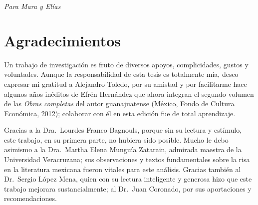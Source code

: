 \documentclass[14pt,twoside,final]{extbook} %
\begin{document}
\setcounter{page}{1}
\parindent=5mm %
\parskip=0mm %
\newpage
\pagestyle{empty}
\newpage
\pagestyle{empty}
\null\vfill
\newpage
\pagestyle{empty}
\vspace*{42pt}
\begin{flushright}
\textit{Para Mara y Elías}
\end{flushright}
\newpage
\pagestyle{empty}
\chapter*{Agradecimientos}\label{ch:agradecimientos}
\thispagestyle{empty}
\pagestyle{fancy}
\fancyhf{} %
\fancyhead[LE,RO]{\thepage}
\renewcommand{\headrulewidth}{0pt}
\setcounter{page}{5}
Un trabajo de investigación es fruto de diversos apoyos, complicidades, gustos y voluntades. Aunque la responsabilidad de esta tesis es totalmente mía, deseo expresar mi gratitud a Alejandro Toledo, por su amistad y por facilitarme hace algunos años inéditos de Efrén Hernández que ahora integran el segundo volumen de las \emph{Obras completas} del autor guanajuatense (México, Fondo de Cultura Económica, 2012); colaborar con él en esta edición fue de total aprendizaje.

Gracias a la Dra.~Lourdes Franco Bagnouls, porque sin su lectura y estímulo, este trabajo, en su primera parte, no hubiera sido posible. Mucho le debo asimismo a la Dra.~Martha Elena Munguía Zatarain, admirada maestra de la Universidad Veracruzana; sus observaciones y textos fundamentales sobre la risa en la literatura mexicana fueron vitales para este análisis. Gracias también al Dr.~Sergio López Mena, quien con su lectura inteligente y generosa hizo que este trabajo mejorara sustancialmente; al Dr.~Juan Coronado, por sus aportaciones y recomendaciones.
\end{document}
